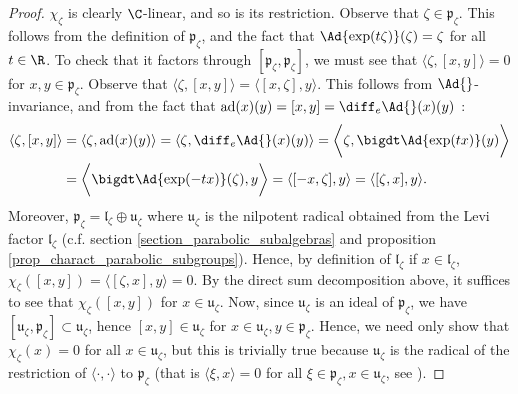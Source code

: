 {
\begin{proof}
    \(\chi_\zeta\) is clearly \(\C\)-linear, and so is its restriction. Observe that \(\zeta \in \mathfrak{p}_\zeta\). This follows from the definition of \(\mathfrak{p}_\zeta\), and the fact that \(\Ad{\exp(t\zeta)}(\zeta)=\zeta\) for all \(t \in \R\). To check that it factors through \([\mathfrak{p}_\zeta, \mathfrak{p}_\zeta]\), we must see that \(\langle \zeta, [x, y]\rangle =0\) for \(x,y \in \mathfrak{p}_\zeta\). Observe that \(\langle \zeta, [x,y]\rangle = \langle [x,\zeta], y \rangle\). This follows from \(\Ad{}\)-invariance, and from the fact that \(\mathrm{ad}(x)(y)=[x,y]=\diff_e \Ad{}(x)(y)\) \parencite[Th. 20.27]{lee_introSM}:
    \begin{align*}
        \langle \zeta, [x,y] \rangle & = \langle \zeta, \mathrm{ad}(x)(y) \rangle = \langle \zeta, \diff_e \Ad{}(x)(y) \rangle = \bigg\langle \zeta, \bigdt \Ad{\exp(tx)}(y) \bigg\rangle  \\
        & = \bigg\langle \bigdt \Ad{\exp(-tx)}(\zeta), y \bigg \rangle =\langle [-x,\zeta], y\rangle = \langle [\zeta,x], y \rangle.
    \end{align*}
    Moreover, \(\mathfrak{p}_\zeta=\mathfrak{l}_\zeta \oplus \mathfrak{u}_\zeta\) where \(\mathfrak{u}_\zeta\) is the nilpotent radical obtained from the Levi factor \(\mathfrak{l}_\zeta\) (c.f. section \ref{section_parabolic_subalgebras} and proposition \ref{prop_charact_parabolic_subgroups}). Hence, by definition of \(\mathfrak{l}_\zeta\) if \(x \in \mathfrak{l}_\zeta\), \(\chi_\zeta([x,y])=\langle [\zeta,x], y \rangle =0\). By the direct sum decomposition above, it suffices to see that \(\chi_\zeta([x,y])\) for \(x \in \mathfrak{u}_\zeta\). Now, since \(\mathfrak{u}_\zeta\) is an ideal of \(\mathfrak{p}_\zeta\), we have \([\mathfrak{u}_\zeta, \mathfrak{p}_\zeta] \subset \mathfrak{u}_\zeta\), hence \([x,y]\in \mathfrak{u}_\zeta\) for \(x\in \mathfrak{u}_\zeta, y \in \mathfrak{p}_\zeta\). Hence, we need only show that \(\chi_\zeta(x)=0\) for all \(x \in \mathfrak{u}_\zeta\), but this is trivially true because \(\mathfrak{u}_\zeta\) is the radical of the restriction of \(\langle \cdot, \cdot  \rangle\) to \(\mathfrak{p}_\zeta\) (that is \(\langle \xi, x\rangle=0\) for all \(\xi \in \mathfrak{p}_\zeta, x \in \mathfrak{u}_\zeta\), see \parencite[Page 273]{knapp2013lie}).
\end{proof}

}
